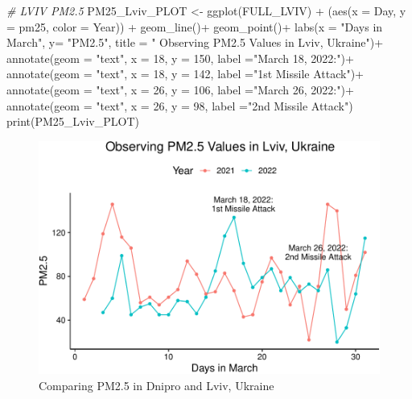 \documentclass[
  12pt,
]{article}
\newenvironment{Shaded}{\begin{snugshade}}{\end{snugshade}}
\newcommand{\AttributeTok}[1]{\textcolor[rgb]{0.77,0.63,0.00}{#1}}
\newcommand{\CommentTok}[1]{\textcolor[rgb]{0.56,0.35,0.01}{\textit{#1}}}
\newcommand{\DecValTok}[1]{\textcolor[rgb]{0.00,0.00,0.81}{#1}}
\newcommand{\FunctionTok}[1]{\textcolor[rgb]{0.00,0.00,0.00}{#1}}
\newcommand{\NormalTok}[1]{#1}
\newcommand{\OtherTok}[1]{\textcolor[rgb]{0.56,0.35,0.01}{#1}}
\newcommand{\SpecialCharTok}[1]{\textcolor[rgb]{0.00,0.00,0.00}{#1}}
\newcommand{\StringTok}[1]{\textcolor[rgb]{0.31,0.60,0.02}{#1}}
\begin{document}
\begin{Shaded}
\begin{Highlighting}[]
\CommentTok{\# LVIV PM2.5}
\NormalTok{PM25\_Lviv\_PLOT }\OtherTok{\textless{}{-}} 
  \FunctionTok{ggplot}\NormalTok{(FULL\_LVIV) }\SpecialCharTok{+} 
\NormalTok{(}\FunctionTok{aes}\NormalTok{(}\AttributeTok{x =}\NormalTok{ Day, }\AttributeTok{y =}\NormalTok{ pm25, }\AttributeTok{color =}\NormalTok{ Year)) }\SpecialCharTok{+} 
              \FunctionTok{geom\_line}\NormalTok{()}\SpecialCharTok{+}  
  \FunctionTok{geom\_point}\NormalTok{()}\SpecialCharTok{+}
  \FunctionTok{labs}\NormalTok{(}\AttributeTok{x =} \StringTok{"Days in March"}\NormalTok{, }\AttributeTok{y=} \StringTok{"PM2.5"}\NormalTok{,}
  \AttributeTok{title =} \StringTok{"          Observing PM2.5 Values in Lviv, Ukraine"}\NormalTok{)}\SpecialCharTok{+} 
  \FunctionTok{annotate}\NormalTok{(}\AttributeTok{geom =} \StringTok{"text"}\NormalTok{, }\AttributeTok{x =} \DecValTok{18}\NormalTok{, }\AttributeTok{y =} \DecValTok{150}\NormalTok{, }\AttributeTok{label =}\StringTok{"March 18, 2022:"}\NormalTok{)}\SpecialCharTok{+} 
  \FunctionTok{annotate}\NormalTok{(}\AttributeTok{geom =} \StringTok{"text"}\NormalTok{, }\AttributeTok{x =} \DecValTok{18}\NormalTok{, }\AttributeTok{y =} \DecValTok{142}\NormalTok{, }\AttributeTok{label =}\StringTok{"1st Missile Attack"}\NormalTok{)}\SpecialCharTok{+} 
  \FunctionTok{annotate}\NormalTok{(}\AttributeTok{geom =} \StringTok{"text"}\NormalTok{, }\AttributeTok{x =} \DecValTok{26}\NormalTok{, }\AttributeTok{y =} \DecValTok{106}\NormalTok{, }\AttributeTok{label =}\StringTok{"March 26, 2022:"}\NormalTok{)}\SpecialCharTok{+} 
  \FunctionTok{annotate}\NormalTok{(}\AttributeTok{geom =} \StringTok{"text"}\NormalTok{, }\AttributeTok{x =} \DecValTok{26}\NormalTok{, }\AttributeTok{y =} \DecValTok{98}\NormalTok{, }\AttributeTok{label =}\StringTok{"2nd Missile Attack"}\NormalTok{)}
\FunctionTok{print}\NormalTok{(PM25\_Lviv\_PLOT)}
\end{Highlighting}
\end{Shaded}

\begin{figure}
\centering
\includegraphics{Fontanie_Gordon_Weinberg_Project_files/figure-latex/Plotting.PM25-2.pdf}
\caption{Comparing PM2.5 in Dnipro and Lviv, Ukraine}
\end{figure}
\end{document}
